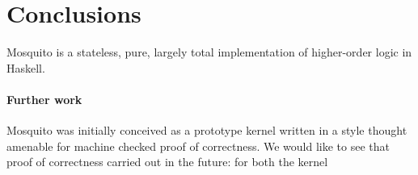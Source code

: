 \documentclass{llncs}
\newcommand{\mosquito}{Mosquito\xspace}
\begin{document}
\section{Conclusions}
\label{sect.conclusions}

\mosquito is a stateless, pure, largely total implementation of higher-order logic in Haskell.

\paragraph{Further work}
Mosquito was initially conceived as a prototype kernel written in a style thought amenable for machine checked proof of correctness.
We would like to see that proof of correctness carried out in the future: for both the kernel


\end{document}
